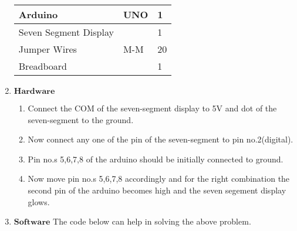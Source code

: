 \documentclass[12pt]{article}
\begin{document}
\begin{enumerate}
\begin{tabular}{|p{5cm}|p{3cm}|p{2cm}|}
	Arduino& UNO& 1\\
	\hline
	Seven Segment Display& & 1\\
	\hline
	Jumper Wires& M-M& 20\\
	\hline
	Breadboard& & 1\\
	\hline
\end{tabular}
\item $\textbf{Hardware}$
	\begin{enumerate}
\item Connect the COM of the seven-segment display to 5V and dot of the seven-segment to the ground.
\item Now connect any one of the pin of the seven-segment to pin no.2(digital).
\item Pin no.s 5,6,7,8 of the arduino should be initially connected to ground.
\item Now move pin no.s 5,6,7,8 accordingly and for the right combination the second pin of the arduino becomes high and the seven segement display glows.
	\end{enumerate}
\item $\textbf{Software}$
	\newline
The code below can help in solving the above problem.

\end{enumerate}
\end{document}

